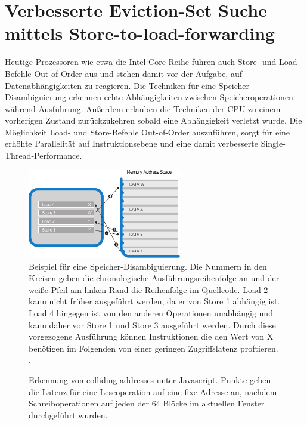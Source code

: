 
\section{Verbesserte Eviction-Set Suche mittels Store-to-load-forwarding}

Heutige Prozessoren wie etwa die Intel Core Reihe führen auch Store- und Load-Befehle Out-of-Order aus und stehen damit vor der Aufgabe, auf Datenabhängigkeiten zu reagieren.
Die Techniken für eine Speicher-Disambiguierung erkennen echte Abhängigkeiten zwischen Speicheroperationen während Ausführung. 
Außerdem erlauben die Techniken der CPU zu einem vorherigen Zustand zurückzukehren sobald eine Abhängigkeit verletzt wurde.
Die Möglichkeit Load- und Store-Befehle Out-of-Order auszuführen, sorgt für eine erhöhte Parallelität auf Instruktionsebene und eine damit verbesserte Single-Thread-Performance.

\begin{figure}[h]
\label{fig:MemoryDisambiguation}
\centering
\includegraphics[width=0.6\textwidth]{methods/memory_disambiguation.pdf}
\caption{Beispiel für eine Speicher-Disambiguierung. Die Nummern in den Kreisen geben die chronologische Ausführungsreihenfolge an und der weiße Pfeil am linken Rand die Reihenfolge im Quellcode. Load 2 kann nicht früher ausgeführt werden, da er von Store 1 abhängig ist. Load 4 hingegen ist von den anderen Operationen unabhängig und kann daher vor Store 1 und Store 3 ausgeführt werden. Durch diese vorgezogene Ausführung können Instruktionen die den Wert von X benötigen im Folgenden von einer geringen Zugriffslatenz proftieren. \cite{CacheAssoWiki}.}
\end{figure}

\newtextend



\label{fig:colliding_addresses_js_measurement}
\begin{figure}[h]
\centering
\begin{scaletikzpicturetowidth}{\textwidth}

\end{scaletikzpicturetowidth}
\caption{Erkennung von colliding addresses unter Javascript. Punkte geben die Latenz für eine Leseoperation auf eine fixe Adresse an, nachdem Schreiboperationen auf jeden der 64 Blöcke im aktuellen Fenster durchgeführt wurden.}
\end{figure}


